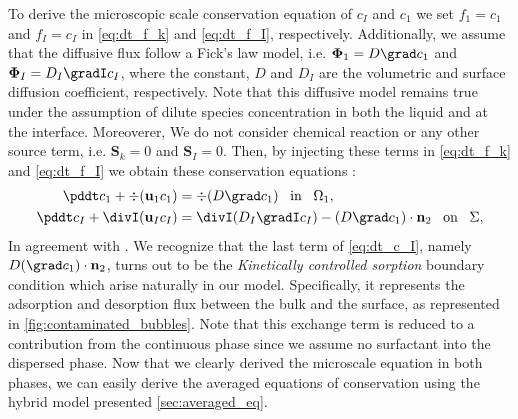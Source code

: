 To derive the microscopic scale conservation equation of $c_I$ and $c_1$ we set $f_1 = c_1$ and $f_I = c_I$ in \ref{eq:dt_f_k} and \ref{eq:dt_f_I}, respectively.
Additionally, we assume that the  diffusive flux follow a Fick's law model, i.e.  $\mathbf{\Phi}_1 = D\grad c_1$ and $\mathbf{\Phi}_I = D_I\gradI c_I$,
where the constant,  $D$ and $D_I$ are the volumetric and surface diffusion coefficient, respectively.
Note that this diffusive model remains true under the assumption of dilute species concentration in both the liquid and at the interface.
Moreoverer, We do not consider chemical reaction or any other source term, i.e. $\textbf{S}_k = 0$ and $\textbf{S}_I=0$. 
Then, by injecting these terms in \ref{eq:dt_f_k} and \ref{eq:dt_f_I} we obtain these conservation equations : 
\begin{align}
    \pddt c_1
    + \div (\textbf{u}_1 c_1)
    &= \div (D \grad c_1)
    \;\;\; \text{in} \;\;\; \Omega_1,\\
    \pddt c_I
    + \divI (\textbf{u}_I c_I)
    &= \divI (D_I \gradI c_I)
    - (D \grad c_1)\cdot \textbf{n}_2
    \;\;\; \text{on} \;\;\; \Sigma,
    \label{eq:dt_c_I}
\end{align}
In agreement with \citet{pesci2018computational,manikantan2020surfactant}.
We recognize that the last term of \ref{eq:dt_c_I}, namely $D(\grad c_1 ) \cdot \textbf{n}_2$, turns out to be the \textit{Kinetically controlled sorption} boundary condition \citet{pesci2018computational,manikantan2020surfactant} which arise naturally in our model.
Specifically, it represents the adsorption and desorption flux between the bulk and the surface, as represented in \ref{fig:contaminated_bubbles}.
Note that this exchange term is reduced to a contribution from the continuous phase since we assume no surfactant into the dispersed phase. 
Now that we clearly derived the microscale equation in both phases, we can easily derive the averaged equations of conservation using the hybrid model presented \ref{sec:averaged_eq}.

